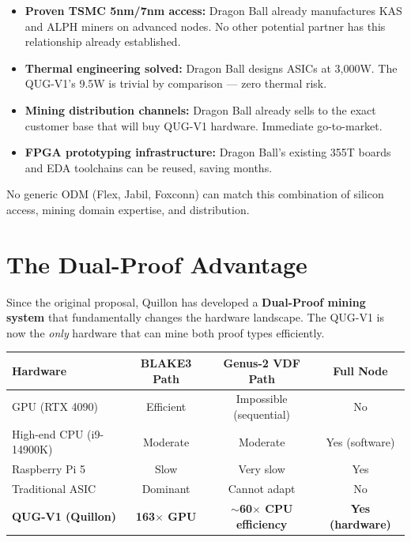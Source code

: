 \documentclass[11pt,a4paper]{article}
\begin{document}
\begin{itemize}[leftmargin=1.5em]
    \item \textbf{Proven TSMC 5nm/7nm access:} Dragon Ball already manufactures KAS and ALPH miners on advanced nodes. No other potential partner has this relationship already established.
    \item \textbf{Thermal engineering solved:} Dragon Ball designs ASICs at 3,000W. The QUG-V1's 9.5W is trivial by comparison --- zero thermal risk.
    \item \textbf{Mining distribution channels:} Dragon Ball already sells to the exact customer base that will buy QUG-V1 hardware. Immediate go-to-market.
    \item \textbf{FPGA prototyping infrastructure:} Dragon Ball's existing 355T boards and EDA toolchains can be reused, saving months.
\end{itemize}

No generic ODM (Flex, Jabil, Foxconn) can match this combination of silicon access, mining domain expertise, and distribution.

\section{The Dual-Proof Advantage}

Since the original proposal, Quillon has developed a \textbf{Dual-Proof mining system} that fundamentally changes the hardware landscape. The QUG-V1 is now the \emph{only} hardware that can mine both proof types efficiently.

\begin{center}
\begin{tabular}{@{}lccc@{}}
\toprule
\textbf{Hardware} & \textbf{BLAKE3 Path} & \textbf{Genus-2 VDF Path} & \textbf{Full Node} \\
\midrule
GPU (RTX 4090) & \textcolor{qnkgreen}{Efficient} & \textcolor{dbred}{Impossible (sequential)} & \textcolor{dbred}{No} \\
High-end CPU (i9-14900K) & \textcolor{dborange}{Moderate} & \textcolor{qnkgreen}{Moderate} & \textcolor{qnkgreen}{Yes (software)} \\
Raspberry Pi 5 & \textcolor{dbred}{Slow} & \textcolor{dbred}{Very slow} & \textcolor{qnkgreen}{Yes} \\
Traditional ASIC & \textcolor{qnkgreen}{Dominant} & \textcolor{dbred}{Cannot adapt} & \textcolor{dbred}{No} \\
\textbf{QUG-V1 (Quillon)} & \textcolor{qnkgreen}{\textbf{163$\times$ GPU}} & \textcolor{qnkgreen}{\textbf{$\sim$60$\times$ CPU efficiency}} & \textcolor{qnkgreen}{\textbf{Yes (hardware)}} \\
\bottomrule
\end{tabular}
\end{center}
\end{document}
